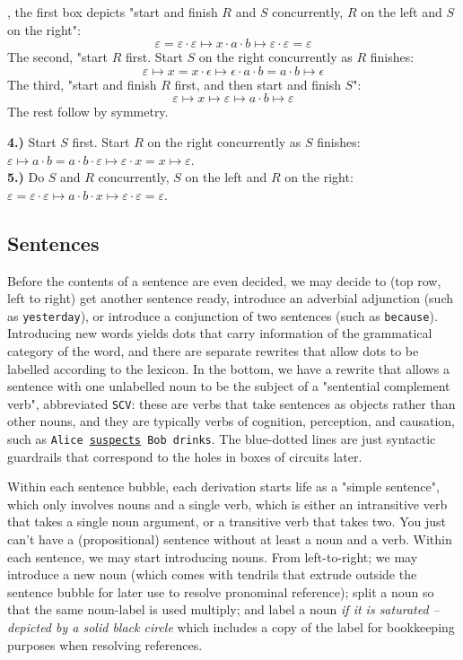 , the first box depicts "start and finish $R$ and $S$ concurrently, $R$ on the left and $S$ on the right": \[\varepsilon = \varepsilon \cdot \varepsilon \mapsto x \cdot a \cdot b \mapsto \varepsilon \cdot \varepsilon = \varepsilon\]
The second, "start $R$ first. Start $S$ on the right concurrently as $R$ finishes: \[\varepsilon \mapsto x = x \cdot \epsilon \mapsto \epsilon \cdot a \cdot b = a \cdot b \mapsto \epsilon\]
The third, "start and finish $R$ first, and then start and finish $S$": \[\varepsilon \mapsto x \mapsto \varepsilon \mapsto a \cdot b \mapsto \varepsilon\]
The rest follow by symmetry.

\textbf{4.)} Start $S$ first. Start $R$ on the right concurrently as $S$ finishes: $\varepsilon \mapsto a \cdot b = a \cdot b \cdot \varepsilon \mapsto \varepsilon \cdot x = x \mapsto \varepsilon $.\\
\textbf{5.)} Do $S$ and $R$ concurrently, $S$ on the left and $R$ on the right: $\varepsilon = \varepsilon \cdot \varepsilon \mapsto a \cdot b \cdot x \mapsto \varepsilon \cdot \varepsilon = \varepsilon$.\\


\subsection{Sentences}

Before the contents of a sentence are even decided, we may decide to (top row, left to right) get another sentence ready, introduce an adverbial adjunction (such as \texttt{yesterday}), or introduce a conjunction of two sentences (such as \texttt{because}). Introducing new words yields dots that carry information of the grammatical category of the word, and there are separate rewrites that allow dots to be labelled according to the lexicon. In the bottom, we have a rewrite that allows a sentence with one unlabelled noun to be the subject of a "sentential complement verb", abbreviated \texttt{SCV}: these are verbs that take sentences as objects rather than other nouns, and they are typically verbs of cognition, perception, and causation, such as \texttt{Alice \underline{suspects} Bob drinks}. The blue-dotted lines are just syntactic guardrails that correspond to the holes in boxes of circuits later.


Within each sentence bubble, each derivation starts life as a "simple sentence", which only involves nouns and a single verb, which is either an intransitive verb that takes a single noun argument, or a transitive verb that takes two. You just can't have a (propositional) sentence without at least a noun and a verb. Within each sentence, we may start introducing nouns. From left-to-right; we may introduce a new noun (which comes with tendrils that extrude outside the sentence bubble for later use to resolve pronominal reference); split a noun so that the same noun-label is used multiply; and label a noun \emph{if it is saturated -- depicted by a solid black circle} which includes a copy of the label for bookkeeping purposes when resolving references.


